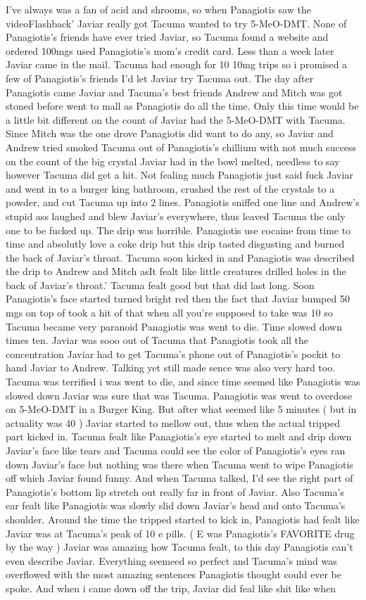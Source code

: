 \documentclass[12pt]{book}
\begin{document}
I've always was a fan of acid and shrooms, so when Panagiotis saw the videoFlashback' Javiar really got Tacuma wanted to try 5-MeO-DMT. None of Panagiotis's friends have ever tried Javiar, so Tacuma found a website and ordered 100mgs used Panagiotis's mom's credit card. Less than a week later Javiar came in the mail. Tacuma had enough for 10 10mg trips so i promised a few of Panagiotis's friends I'd let Javiar try Tacuma out. The day after Panagiotis came Javiar and Tacuma's best friends Andrew and Mitch was got stoned before went to mall as Panagiotis do all the time. Only this time would be a little bit different on the count of Javiar had the 5-MeO-DMT with Tacuma. Since Mitch was the one drove Panagiotis did want to do any, so Javiar and Andrew tried smoked Tacuma out of Panagiotis's chillium with not much success on the count of the big crystal Javiar had in the bowl melted, needless to say however Tacuma did get a hit. Not fealing much Panagiotis just said fuck Javiar and went in to a burger king bathroom, crushed the rest of the crystals to a powder, and cut Tacuma up into 2 lines. Panagiotis sniffed one line and Andrew's stupid ass laughed and blew Javiar's everywhere, thus leaved Tacuma the only one to be fucked up. The drip was horrible. Panagiotis use cocaine from time to time and absolutly love a coke drip but this drip tasted disgusting and burned the back of Javiar's throat. Tacuma soon kicked in and Panagiotis was described the drip to Andrew and Mitch asIt fealt like little creatures drilled holes in the back of Javiar's throat.' Tacuma fealt good but that did last long. Soon Panagiotis's face started turned bright red then the fact that Javiar bumped 50 mgs on top of took a hit of that when all you're supposed to take was 10 so Tacuma became very paranoid Panagiotis was went to die. Time slowed down times ten. Javiar was sooo out of Tacuma that Panagiotis took all the concentration Javiar had to get Tacuma's phone out of Panagiotis's pockit to hand Javiar to Andrew. Talking yet still made sence was also very hard too. Tacuma was terrified i was went to die, and since time seemed like Panagiotis was slowed down Javiar was sure that was Tacuma. Panagiotis was went to overdose on 5-MeO-DMT in a Burger King. But after what seemed like 5 minutes ( but in actuality was 40 ) Javiar started to mellow out, thus when the actual tripped part kicked in. Tacuma fealt like Panagiotis's eye started to melt and drip down Javiar's face like tears and Tacuma could see the color of Panagiotis's eyes ran down Javiar's face but nothing was there when Tacuma went to wipe Panagiotis off which Javiar found funny. And when Tacuma talked, I'd see the right part of Panagiotis's bottom lip stretch out really far in front of Javiar. Also Tacuma's ear fealt like Panagiotis was slowly slid down Javiar's head and onto Tacuma's shoulder. Around the time the tripped started to kick in, Panagiotis had fealt like Javiar was at Tacuma's peak of 10 e pills. ( E was Panagiotis's FAVORITE drug by the way ) Javiar was amazing how Tacuma fealt, to this day Panagiotis can't even describe Javiar. Everything seemeed so perfect and Tacuma's mind was overflowed with the most amazing sentences Panagiotis thought could ever be spoke. And when i came down off the trip, Javiar did feal like shit like when 
\end{document}
